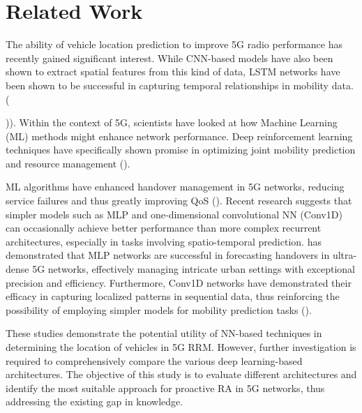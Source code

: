 \documentclass[journal,onecolumn]{IEEEtran}
\begin{document}
\section{Related Work} \label{related-work}
The ability of vehicle location prediction to improve 5G radio performance has recently gained significant interest. While CNN-based models have also been shown to extract spatial features from this kind of data, LSTM networks have been shown to be successful in capturing temporal relationships in mobility data. ({\cite{9349962,7870510})). Within the context of 5G, scientists have looked at how Machine Learning (ML) methods might enhance network performance. Deep reinforcement learning techniques have specifically shown promise in optimizing joint mobility prediction and resource management (\cite{7725934,tvt23choi}).

ML algorithms have enhanced handover management in 5G networks, reducing service failures and thus greatly improving QoS (\cite{7792669,PRIYANKA2023100389}). Recent research suggests that simpler models such as MLP and one-dimensional convolutional NN (Conv1D) can occasionally achieve better performance than more complex recurrent architectures, especially in tasks involving spatio-temporal prediction. \cite{cikm23zhang} has demonstrated that MLP networks are successful in forecasting handovers in ultra-dense 5G networks, effectively managing intricate urban settings with exceptional precision and efficiency. Furthermore, Conv1D networks have demonstrated their efficacy in capturing localized patterns in sequential data, thus reinforcing the possibility of employing simpler models for mobility prediction tasks (\cite{7870510}).

These studies demonstrate the potential utility of NN-based techniques in determining the location of vehicles in 5G RRM. However, further investigation is required to comprehensively compare the various deep learning-based architectures. The objective of this study is to evaluate different architectures and identify the most suitable approach for proactive RA in 5G networks, thus addressing the existing gap in knowledge.
\clearpage

}
\end{document}
